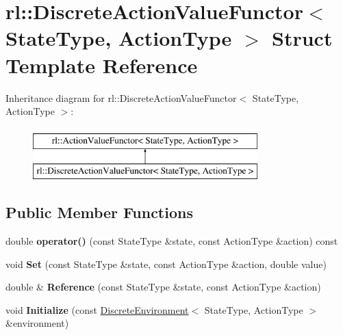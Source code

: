 \hypertarget{structrl_1_1_discrete_action_value_functor}{}\section{rl\+:\+:Discrete\+Action\+Value\+Functor$<$ State\+Type, Action\+Type $>$ Struct Template Reference}
\label{structrl_1_1_discrete_action_value_functor}
Inheritance diagram for rl\+:\+:Discrete\+Action\+Value\+Functor$<$ State\+Type, Action\+Type $>$\+:\begin{figure}[H]
\begin{center}
\leavevmode
\includegraphics[height=2.000000cm]{structrl_1_1_discrete_action_value_functor}
\end{center}
\end{figure}
\subsection*{Public Member Functions}
\begin{DoxyCompactItemize}
\item 
\hypertarget{structrl_1_1_discrete_action_value_functor_a74c6f0ed5af23c049dafac2b7b02f8f6}{}\label{structrl_1_1_discrete_action_value_functor_a74c6f0ed5af23c049dafac2b7b02f8f6} 
double {\bfseries operator()} (const State\+Type \&state, const Action\+Type \&action) const
\item 
\hypertarget{structrl_1_1_discrete_action_value_functor_a05b2e109cfcde8169b5cec710412cb54}{}\label{structrl_1_1_discrete_action_value_functor_a05b2e109cfcde8169b5cec710412cb54} 
void {\bfseries Set} (const State\+Type \&state, const Action\+Type \&action, double value)
\item 
\hypertarget{structrl_1_1_discrete_action_value_functor_ad5410da045429c232d1921faf21fb65f}{}\label{structrl_1_1_discrete_action_value_functor_ad5410da045429c232d1921faf21fb65f} 
double \& {\bfseries Reference} (const State\+Type \&state, const Action\+Type \&action)
\item 
\hypertarget{structrl_1_1_discrete_action_value_functor_aa792c601f33d5f9b614423a39eeecd18}{}\label{structrl_1_1_discrete_action_value_functor_aa792c601f33d5f9b614423a39eeecd18} 
void {\bfseries Initialize} (const \hyperlink{classrl_1_1_discrete_environment}{Discrete\+Environment}$<$ State\+Type, Action\+Type $>$ \&environment)
\end{DoxyCompactItemize}
